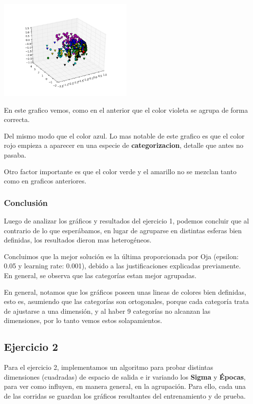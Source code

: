 \includegraphics[width=0.5\textwidth]{img/ej1_oja_005_240}

En este grafico vemos, como en el anterior que el color violeta se agrupa de forma correcta.

Del mismo modo que el color azul. Lo mas notable de este grafico es que el color rojo empieza a aparecer en una especie de \textbf{categorizacion}, detalle que antes no pasaba. 

Otro factor importante es que el color verde y el amarillo no se mezclan tanto como en graficos anteriores.

\subsubsection{Conclusi\'on}

Luego de analizar los gr\'aficos y resultados del ejercicio 1, podemos concluir que al contrario de lo que esper\'abamos, en lugar de agruparse en distintas esferas bien definidas, los resultados dieron mas heterog\'eneos.

Concluimos que la mejor soluci\'on es la \'ultima proporcionada por Oja (epsilon: 0.05 y learning rate: 0.001), debido a las justificaciones explicadas previamente. En general, se observa que las categor\'ias estan mejor agrupadas.

En general, notamos que los gr\'aficos poseen unas lineas de colores bien definidas, esto es, asumiendo que las categor\'ias son ortogonales, porque cada categor\'ia trata de ajustarse a una dimensi\'on, y al haber 9 categor\'ias no alcanzan las dimensiones, por lo tanto vemos estos solapamientos.

\subsection{Ejercicio 2}

Para el ejercicio 2, implementamos un algoritmo para probar distintas dimensiones (cuadradas) de espacio de salida e ir variando los \textbf{Sigma} y \textbf{\'Epocas}, para ver como influyen, en manera general, en la agrupaci\'on. Para ello, cada una de las corridas se guardan los gr\'aficos resultantes del entrenamiento y de prueba.

